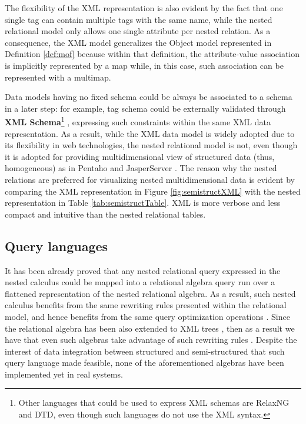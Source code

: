 The flexibility of the XML representation is also evident by the fact that one single tag can contain multiple tags with the same name, while the nested relational model only allows one single attribute per nested relation. As a consequence, the XML model generalizes the Object model represented in Definition \vref{def:mof} because within that definition, the attribute-value association is implicitly represented by a map while, in this case, such association can be represented with a multimap.

Data models having no fixed schema could be always be associated to a schema in a later step: for example, tag schema could be externally validated through \textbf{XML Schema}\footnote{Other languages that could be used to express XML schemas are RelaxNG and DTD, even though such languages do not use the XML syntax.} \cite{VlistXS}, expressing such constraints within the same XML data representation. As a result, while the XML data model is widely adopted due to its flexibility in web technologies, the nested relational model is not, even though it is adopted for providing multidimensional view of structured data (thus, homogeneous) as in Pentaho \cite{Pentaho} and JasperServer \cite{Parra}. The reason why the nested relations are preferred for visualizing nested multidimensional data is evident by comparing the XML representation in Figure \ref{fig:semistructXML} with the nested representation in Table \ref{tab:semistructTable}. XML is more verbose and less compact and intuitive than  the nested relational tables.




\subsection{Query languages}
It has been already proved that any nested relational query expressed in the nested calculus could be mapped into a relational algebra query run over a flattened representation of the nested relational algebra. As a result, such nested calculus benefits from the same rewriting rules presented within the relational model, and hence benefits from the same query optimization operations \cite{ParedaensG92}. Since the relational algebra has been also extended to XML trees \cite{Lu2006}, then as a result we have that even such algebras take advantage of such rewriting rules \cite{Magnani06}. Despite the interest of data integration between structured and semi-structured that such query language made feasible, none of the aforementioned algebras have been implemented yet in real systems.

